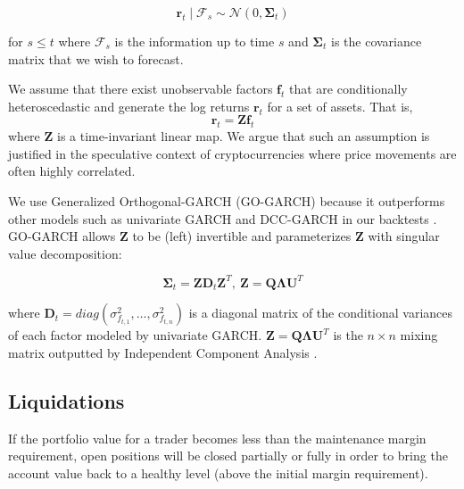 \documentclass{article}
\begin{document}
\begin{equation}
\mathbf{r}_t \mid \mathcal{F}_{s} \sim \mathcal{N}(0, \mathbf{\Sigma}_t)
\end{equation}

for $s \leq t$ where $\mathcal{F}_{s}$ is the information up to time $s$ and $\mathbf{\Sigma}_t$ is the covariance matrix that we wish to forecast.

We assume that there exist unobservable factors $\mathbf{f}_t$ that are conditionally heteroscedastic and generate the log returns $\mathbf{r}_t$ for a set of assets. That is, 
\begin{equation}
    \mathbf{r}_t = \mathbf{Z} \mathbf{f}_t
\end{equation}
where $\mathbf{Z}$ is a time-invariant linear map. We argue that such an assumption is justified in the speculative context of cryptocurrencies where price movements are often highly correlated. 

We use Generalized Orthogonal-GARCH (GO-GARCH) \cite{van2002go} because it outperforms other models such as univariate GARCH and DCC-GARCH in our backtests \cite{vest2023vol}. GO-GARCH allows $\mathbf{Z}$ to be (left) invertible and parameterizes $\mathbf{Z}$ with singular value decomposition:

\begin{equation}
    \mathbf{\Sigma}_t = \mathbf{Z} \mathbf{D}_t \mathbf{Z}^T,\ \mathbf{Z} = \mathbf{Q} \boldsymbol{\Lambda} \mathbf{U}^T
\end{equation}

where $\mathbf{D}_t = diag(\sigma^2_{f_{t,1}}, \ldots, \sigma^2_{f_{t, n}})$ is a diagonal matrix of the conditional variances of each factor modeled by univariate GARCH. $\mathbf{Z} = \mathbf{Q}\boldsymbol{\Lambda}\mathbf{U}^T$ is the $n \times n$ mixing matrix outputted by Independent Component Analysis \cite{ghalanos2019rmgarch}. 


\subsection{Liquidations} \label{liq}
If the portfolio value for a trader becomes less than the maintenance margin requirement, open positions will be closed partially or fully in order to bring the account value back to a healthy level (above the initial margin requirement). 
\end{document}

